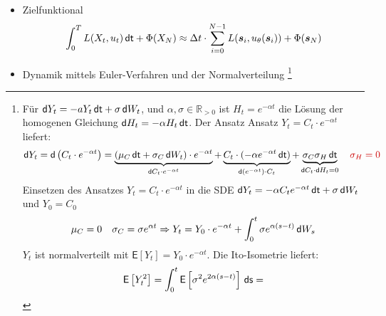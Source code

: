 \documentclass[a4paper, 12pt]{scrartcl}
\newcommand{\rot}[2][rot]{\textcolor{#1}{#2}}
\newcommand{\dt}{\thinspace \mathsf{dt}}
\newcommand{\ds}{\thinspace \mathsf{ds}}
\newcommand{\dW}{\thinspace \mathsf{d}W}
\begin{document}
\begin{itemize}
    \item Zielfunktional
    \begin{align*}
        \int_{0}^{T} L(X_t,u_t) \dt + \Phi(X_N) 
        \approx 
        \Delta t \cdot \sum_{i=0}^{N-1} L(\bm{s}_i, u_\theta (\bm{s}_i)) + \Phi(\bm{s}_N)
    \end{align*}

    \item Dynamik mittels Euler-Verfahren und der Normalverteilung
    \footnote{
        Für 
        $\mathsf{d}Y_{t} = -a Y_t \dt + \sigma \dW_{t}$,
        und 
        $\alpha, \sigma \in \mathbb{R}_{>0}$
        ist $H_t = e^{-\alpha t}$ die Lösung der homogenen Gleichung
        $\mathsf{d}H_{t} = -\alpha H_t \dt$.  
        Der Ansatz Ansatz $Y_t = C_t \cdot e^{-\alpha t}$ liefert:
        \begin{align*}
            \mathsf{d}Y_{t} 
            =
            \mathsf{d}\left( C_t \cdot e^{-\alpha t} \right)
            = 
            \underbrace{
                (\mu_C \dt + \sigma_C \dW_t) \cdot e^{-\alpha t}
            }_{
                \mathsf{d}C_{t} \cdot e^{-\alpha t}
            }
            + 
            \underbrace{
                C_t \cdot (-\alpha e^{-\alpha t} \dt)
            }_{
                \mathsf{d}\left(e^{-\alpha t}\right) \cdot C_t
            } 
            + 
            \underbrace{
                \sigma_C \sigma_H \dt
            }_{
                \mathsf{d}C_t \cdot \mathsf{d}H_t = 0
            } 
            \quad
            \rot{\sigma_H = 0}
        \end{align*}
        Einsetzen des Ansatzes $Y_t = C_t \cdot e^{-\alpha t}$ 
        in die SDE $\mathsf{d}Y_t = -\alpha C_t e^{-\alpha t} \dt + \sigma \dW_{t}$ und $Y_0 = C_0$
        \begin{align*}
            \mu_C = 0 \quad \sigma_C = \sigma e^{\alpha t}  
            \Rightarrow
            Y_t = 
            Y_0 \cdot e^{-\alpha t} +
            \int_{0}^{t} \sigma e^{\alpha (s-t)} \dW_s
        \end{align*}
        $Y_t$ ist normalverteilt mit $\mathsf{E}[Y_t] =Y_0 \cdot e^{-\alpha t}$. Die Ito-Isometrie liefert:
        \begin{align*}
            \mathsf{E}\left[Y_t^2\right] 
            =
                \int_{0}^{t} \mathsf{E}\left[ \sigma^2 e^{2\alpha (s-t)} \right] \ds
            =

\end{align*}}
\end{itemize}
\end{document}
